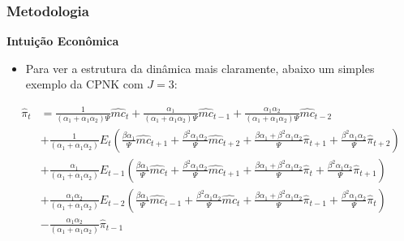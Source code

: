 \documentclass[aspectratio=169]{beamer}
\begin{document}
\begin{frame}[shrink=20]\frametitle{Metodologia}
  \textbf{Intuição Econômica}
  \begin{itemize}
  \item Para ver a estrutura da dinâmica mais claramente, abaixo um simples exemplo da CPNK com $J=3$:
  \end{itemize}
  \begin{align*}
{ \hat { \pi  }  }_{ t }
&=\frac { 1 }{ \left( { \alpha  }_{ 1 }+{ \alpha  }_{ 1 }{ \alpha  }_{ 2 } \right) \Psi  } { \hat { mc }  }_{ t }+\frac { { \alpha  }_{ 1 } }{ \left( { \alpha  }_{ 1 }+{ \alpha  }_{ 1 }{ \alpha  }_{ 2 } \right) \Psi  } { \hat { mc }  }_{ t-1 }+\frac { { \alpha  }_{ 1 }{ \alpha  }_{ 2 } }{ \left( { \alpha  }_{ 1 }+{ \alpha  }_{ 1 }{ \alpha  }_{ 2 } \right) \Psi  } { \hat { mc }  }_{ t-2 } \\
&+\frac { 1 }{ \left( { \alpha  }_{ 1 }+{ \alpha  }_{ 1 }{ \alpha  }_{ 2 } \right)  } { E }_{ t }\left( \frac { \beta { \alpha  }_{ 1 } }{ \Psi  } { \hat { mc }  }_{ t+1 }+\frac { { \beta  }^{ 2 }{ \alpha  }_{ 1 }{ \alpha  }_{ 2 } }{ \Psi  } { \hat { mc }  }_{ t+2 }+\frac { { \beta { \alpha  }_{ 1 }+\beta  }^{ 2 }{ \alpha  }_{ 1 }{ \alpha  }_{ 2 } }{ \Psi  } { \hat { \pi  }  }_{ t+1 }+\frac { { \beta  }^{ 2 }{ \alpha  }_{ 1 }{ \alpha  }_{ 2 } }{ \Psi  } { \hat { \pi  }  }_{ t+2 } \right) \\
&+\frac { { \alpha  }_{ 1 } }{ \left( { \alpha  }_{ 1 }+{ \alpha  }_{ 1 }{ \alpha  }_{ 2 } \right)  } { E }_{ t-1 }\left( \frac { \beta { \alpha  }_{ 1 } }{ \Psi  } { \hat { mc }  }_{ t }+\frac { { \beta  }^{ 2 }{ \alpha  }_{ 1 }{ \alpha  }_{ 2 } }{ \Psi  } { \hat { mc }  }_{ t+1 }+\frac { { \beta { \alpha  }_{ 1 }+\beta  }^{ 2 }{ \alpha  }_{ 1 }{ \alpha  }_{ 2 } }{ \Psi  } { \hat { \pi  }  }_{ t }+\frac { { \beta  }^{ 2 }{ \alpha  }_{ 1 }{ \alpha  }_{ 2 } }{ \Psi  } { \hat { \pi  }  }_{ t+1 } \right) \\
&+\frac { { \alpha  }_{ 1 }{ \alpha  }_{ 2 } }{ \left( { \alpha  }_{ 1 }+{ \alpha  }_{ 1 }{ \alpha  }_{ 2 } \right)  } { E }_{ t-2 }\left( \frac { \beta { \alpha  }_{ 1 } }{ \Psi  } { \hat { mc }  }_{ t-1 }+\frac { { \beta  }^{ 2 }{ \alpha  }_{ 1 }{ \alpha  }_{ 2 } }{ \Psi  } { \hat { mc }  }_{ t }+\frac { { \beta { \alpha  }_{ 1 }+\beta  }^{ 2 }{ \alpha  }_{ 1 }{ \alpha  }_{ 2 } }{ \Psi  } { \hat { \pi  }  }_{ t-1 }+\frac { { \beta  }^{ 2 }{ \alpha  }_{ 1 }{ \alpha  }_{ 2 } }{ \Psi  } { \hat { \pi  }  }_{ t } \right) \\
&-\frac { { \alpha  }_{ 1 }{ \alpha  }_{ 2 } }{ \left( { \alpha  }_{ 1 }+{ \alpha  }_{ 1 }{ \alpha  }_{ 2 } \right)  } { \hat { \pi  }  }_{ t-1 }
  \end{align*}
\end{frame}
\end{document}
